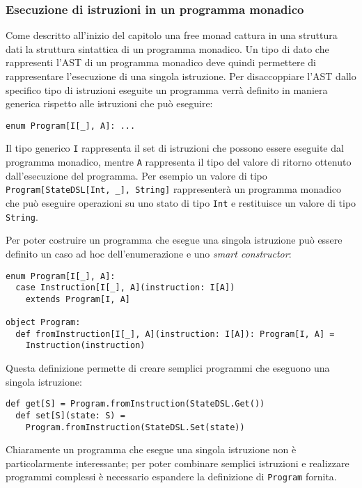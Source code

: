 \subsubsection{Esecuzione di istruzioni in un programma monadico}
Come descritto all'inizio del capitolo una free monad cattura in una struttura dati la struttura sintattica di un programma monadico.
Un tipo di dato che rappresenti l'AST di un programma monadico deve quindi permettere di rappresentare l'esecuzione di una singola istruzione.
Per disaccoppiare l'AST dallo specifico tipo di istruzioni eseguite un programma verrà definito in maniera generica rispetto alle istruzioni che può eseguire:
\begin{lstlisting}[language=scala3]
enum Program[I[_], A]: ...
\end{lstlisting}
Il tipo generico \lstinline{I} rappresenta il set di istruzioni che possono essere eseguite dal programma monadico, mentre \lstinline{A} rappresenta il tipo del valore di ritorno ottenuto dall'esecuzione del programma. Per esempio un valore di tipo \lstinline{Program[StateDSL[Int, _], String]} rappresenterà un programma monadico che può eseguire operazioni su uno stato di tipo \lstinline{Int} e restituisce un valore di tipo \lstinline{String}.

Per poter costruire un programma che esegue una singola istruzione può essere definito un caso ad hoc dell'enumerazione e uno \emph{smart constructor}:
\begin{lstlisting}[language=scala3]
enum Program[I[_], A]:
  case Instruction[I[_], A](instruction: I[A])
    extends Program[I, A]

object Program:
  def fromInstruction[I[_], A](instruction: I[A]): Program[I, A] =
    Instruction(instruction)
\end{lstlisting}

Questa definizione permette di creare semplici programmi che eseguono una singola istruzione:
\begin{lstlisting}[language=scala3]
  def get[S] = Program.fromInstruction(StateDSL.Get())
  def set[S](state: S) =
    Program.fromInstruction(StateDSL.Set(state))
\end{lstlisting}

Chiaramente un programma che esegue una singola istruzione non è particolarmente interessante; per poter combinare semplici istruzioni e realizzare programmi complessi è necessario espandere la definizione di \lstinline{Program} fornita.

